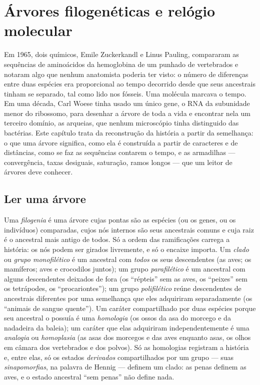 \chapter{Árvores filogenéticas e relógio molecular}\label{ch:b2:phylogenetic-trees}

Em 1965, dois químicos, Emile Zuckerkandl e Linus Pauling, compararam
as sequências de aminoácidos da hemoglobina de um punhado de vertebrados
e notaram algo que nenhum anatomista poderia ter visto: o número de
diferenças entre duas espécies era proporcional ao tempo decorrido desde
que seus ancestrais tinham se separado, tal como lido nos fósseis. Uma
molécula marcava o tempo. Em uma década, Carl Woese tinha usado um único
gene, o RNA da subunidade menor do ribossomo, para desenhar a árvore de
toda a vida e encontrar nela um terceiro domínio, as arqueias, que nenhum
microscópio tinha distinguido das bactérias. Este capítulo trata da
reconstrução da história a partir da semelhança: o que uma árvore
significa, como ela é construída a partir de caracteres e de distâncias,
como se faz as sequências contarem o tempo, e as armadilhas ---
convergência, taxas desiguais, saturação, ramos longos --- que um leitor
de árvores deve conhecer.

\section{Ler uma árvore}

\begin{definition}\label{def:b2:phylogenetic-trees:tree}
Uma \emph{filogenia} é uma árvore cujas pontas são as espécies (ou os
genes, ou os indivíduos) comparadas, cujos nós internos são seus
ancestrais comuns e cuja raiz é o ancestral mais antigo de todos. Só a
ordem das ramificações carrega a história: os nós podem ser girados
livremente, e só o encaixe importa. Um \emph{clado} ou \emph{grupo
monofilético} é um ancestral com \emph{todos} os seus descendentes (as
aves; os mamíferos; aves e crocodilos juntos); um grupo
\emph{parafilético} é um ancestral com alguns descendentes deixados de
fora (os ``répteis'' sem as aves, os ``peixes'' sem os tetrápodes, os
``procariontes''); um grupo \emph{polifilético} reúne descendentes de
ancestrais diferentes por uma semelhança que eles adquiriram
separadamente (os ``animais de sangue quente''). Um caráter
compartilhado por duas espécies porque seu ancestral o possuía é uma
\emph{homologia} (os ossos da asa do morcego e da nadadeira da baleia);
um caráter que elas adquiriram independentemente é uma \emph{analogia}
ou \emph{homoplasia} (as asas dos morcegos e das aves enquanto asas, os
olhos em câmara dos vertebrados e dos polvos). Só as homologias
registram a história e, entre elas, só os estados \emph{derivados}
compartilhados por um grupo --- suas \emph{sinapomorfias}, na palavra de
Hennig --- definem um clado: as penas definem as aves, e o estado
ancestral ``sem penas'' não define nada.
\end{definition}

